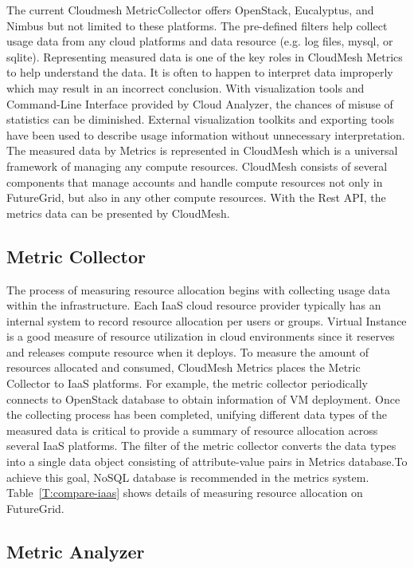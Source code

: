 \documentclass{tex/sig-alternate}
\begin{document}
{The current Cloudmesh MetricCollector offers OpenStack, Eucalyptus, and Nimbus but not
limited to these platforms. The pre-defined filters help collect usage
data from any cloud platforms and data resource (e.g. log files,
mysql, or sqlite). Representing measured data is one of the key roles
in CloudMesh Metrics to help understand the data. It is often to
happen to interpret data improperly which may result in an incorrect
conclusion. With visualization tools and Command-Line Interface
provided by Cloud Analyzer, the chances of misuse of statistics can be
diminished. External visualization toolkits and exporting tools have
been used to describe usage information without unnecessary
interpretation. The measured data by Metrics is represented in
CloudMesh which is a universal framework of managing any compute
resources. CloudMesh consists of several components that manage
accounts and handle compute resources not only in FutureGrid, but also
in any other compute resources. With the Rest API, the metrics data
can be presented by CloudMesh.

 



\subsection{Metric Collector}

The process of measuring resource allocation begins with collecting
usage data within the infrastructure. Each IaaS cloud resource
provider typically has an internal system to record resource
allocation per users or groups. Virtual Instance is a good measure of
resource utilization in cloud environments since it reserves and
releases compute resource when it deploys. To measure the amount of
resources allocated and consumed, CloudMesh Metrics places the Metric
Collector to IaaS platforms. For example, the metric collector
periodically connects to OpenStack database to obtain information of
VM deployment. Once the collecting process has been completed,
unifying different data types of the measured data is critical to
provide a summary of resource allocation across several IaaS
platforms. The filter of the metric collector converts the data types
into a single data object consisting of attribute-value pairs in
Metrics database.To achieve this goal, NoSQL database is recommended
in the metrics system.  Table~\ref{T:compare-iaas} shows details of
measuring resource allocation on FutureGrid.

\subsection{Metric Analyzer}

}
\end{document}
